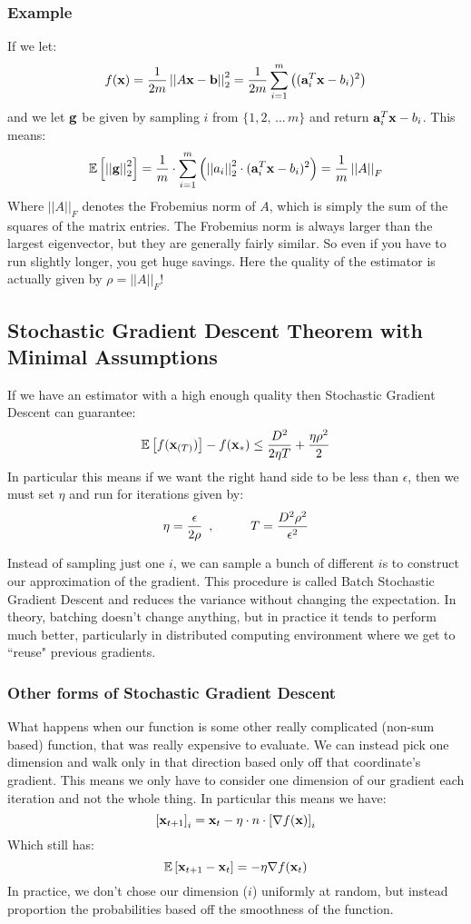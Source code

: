 \documentclass[11pt]{article}
\newcommand{\ltnorm} [1] {
  \left| \left| #1 \right| \right|_{2}
}
\begin{document}
\subsubsection*{Example}
If we let:
\[ f({\bf x}) =\frac{1}{2m} \ltnorm{A {\bf x} - {\bf b}}^{2} = \frac{1}{2m} \sum_{i = 1}^{m} \left( ({\bf a}_{i}^{T} {\bf x} - b_{i})^{2} \right) \]
and we let ${\bf g}$ be given by sampling $i$ from $\lbrace 1, 2, \,...\, m \rbrace$ and return ${\bf a}_{i}^{T} {\bf x} - b_{i}$.  This means:
\[ \mathbb{E} \left[ \ltnorm{\bf g}^{2} \right] = \frac{1}{m} \cdot \sum_{i = 1}^{m} \left( \ltnorm{a_{i}}^{2} \cdot ({\bf a}_{i}^{T}{\bf x} - b_{i})^{2} \right) = \frac{1}{m} \left| \left| A \right| \right|_{F}\]
Where $\left| \left| A \right| \right|_{F}$ denotes the Frobemius norm of $A$, which is simply the sum of the squares of the matrix entries.  The Frobemius norm is always larger than the largest eigenvector, but they are generally fairly similar.  So even if you have to run slightly longer, you get huge savings.  Here the quality of the estimator is actually given by $\rho = \left| \left| A \right| \right|_{F}$!


\subsection{Stochastic Gradient Descent Theorem with Minimal Assumptions}
If we have an estimator with a high enough quality then Stochastic Gradient Descent can guarantee:
\[ \mathbb{E} \left[ f({\bf x}_{(T)}) \right] - f({\bf x}_{\ast}) \leq \frac{D^{2}}{2 \eta T} + \frac{\eta \rho^{2}}{2} \]
In particular this means if we want the right hand side to be less than $\epsilon$, then we must set $\eta$ and run for iterations given by:
\[ \eta = \frac{\epsilon}{2 \rho} \,\,\,,\hspace*{1cm} T = \frac{D^{2}\rho^{2}}{\epsilon^{2}} \]

Instead of sampling just one $i$, we can sample a bunch of different $i$s to construct our approximation of the gradient.  This procedure is called Batch Stochastic Gradient Descent and reduces the variance without changing the expectation.  In theory, batching doesn't change anything, but in practice it tends to perform much better, particularly in distributed computing environment where we get to ``reuse" previous gradients.

\subsubsection{Other forms of Stochastic Gradient Descent}
What happens when our function is some other really complicated (non-sum based) function, that was really expensive to evaluate.  We can instead pick one dimension and walk only in that direction based only off that coordinate's gradient.  This means we only have to consider one dimension of our gradient each iteration and not the whole thing.  In particular this means we have:
\[ \left[ {\bf x}_{t + 1} \right]_{i} = {\bf x}_{t} - \eta \cdot n \cdot \left[ \nabla f ({\bf x}) \right]_{i} \]
Which still has:
\[ \mathbb{E} \left[ {\bf x}_{t + 1} - {\bf x}_{t} \right] = - \eta \nabla f ({\bf x}_{t}) \]
In practice, we don't chose our dimension ($i$) uniformly at random, but instead proportion the probabilities based off the smoothness of the function.
\end{document}
